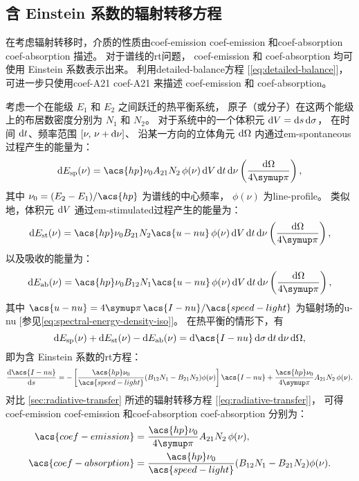 \subsection{含 Einstein 系数的辐射转移方程}

在考虑辐射转移时，介质的性质由\acl{coef-emission} \acs{coef-emission}
和\acl{coef-absorption} \acs{coef-absorption} 描述。
对于谱线的\ac{rt}问题，
\acs{coef-emission} 和 \acs{coef-absorption} 均可使用 Einstein 系数表示出来。
利用\ac{detailed-balance}方程 [\autoref{eq:detailed-balance}]，
可进一步只使用\acl{coef-A21} \ac{coef-A21}
来描述 \acs{coef-emission} 和 \acs{coef-absorption}。

考虑一个在能级 $E_1$ 和 $E_2$ 之间跃迁的热平衡系统，
原子（或分子）在这两个能级上的布居数密度分别为 $N_1$ 和 $N_2$。
对于系统中的一个体积元 $\mathrm{d}V = \mathrm{d}s\,\mathrm{d}\sigma$，
在时间 $\mathrm{d}t$、频率范围 $[\nu, \,\nu+\mathrm{d}\nu]$、
沿某一方向的立体角元 $\mathrm{d}\Omega$ 内通过\ac{em-spontaneous}过程产生的能量为：
\begin{equation}
  \D{E_{\R{sp}}(\nu)}
    = \acs{hp} \nu_0 A_{21} N_2 \,\phi(\nu)
      \,\D{V}\,\D{t}\,\D{\nu} \left( \frac{\D{\Omega}}{4\Cpi} \right) ,
\end{equation}
其中 $\nu_0 = (E_2 - E_1) / \acs{hp}$ 为谱线的中心频率，
$\phi(\nu)$ 为\acf{line-profile}。
类似地，体积元 $\mathrm{d}V$ 通过\ac{em-stimulated}过程产生的能量为：
\begin{equation}
  \D{E_{\R{st}}(\nu)}
    = \acs{hp} \nu_0 B_{21} N_2 \acs{u-nu} \,\phi(\nu)
      \,\D{V}\,\D{t}\,\D{\nu} \left( \frac{\D{\Omega}}{4\Cpi} \right) ,
\end{equation}
以及吸收的能量为：
\begin{equation}
  \D{E_{\R{ab}}(\nu)}
    = \acs{hp} \nu_0 B_{12} N_1 \acs{u-nu} \,\phi(\nu)
      \,\D{V}\,\D{t}\,\D{\nu} \left( \frac{\D{\Omega}}{4\Cpi} \right) ,
\end{equation}
其中
$\acs{u-nu} = 4\Cpi\,\acs{I-nu} / \acs{speed-light}$
为辐射场的\acl{u-nu} [参见\autoref{eq:spectral-energy-density-iso}]。
在热平衡的情形下，有
\begin{equation}
  \D{E_{\R{sp}}(\nu)} + \D{E_{\R{st}}(\nu)} - \D{E_{\R{ab}}(\nu)}
    = \D{\acs{I-nu}}\,\D{\sigma}\,\D{t}\,\D{\nu}\,\D{\Omega} ,
\end{equation}
即为含 Einstein 系数的\ac{rt}方程：
\begin{equation}
  \diff{\acs{I-nu}}{s}
    = - \left [ \frac{\acs{hp} \nu_0}{\acs{speed-light}}
      (B_{12} N_1 - B_{21} N_2) \phi(\nu) \right] \acs{I-nu}
      + \frac{\acs{hp} \nu_0}{4\Cpi} A_{21} N_2 \,\phi(\nu) .
\end{equation}
对比 \autoref{sec:radiative-transfer} 所述的辐射转移方程
[\autoref{eq:radiative-transfer}]，
可得\acl{coef-emission} \acs{coef-emission}
和\acl{coef-absorption} \acs{coef-absorption} 分别为：
\begin{align}
  \acs{coef-emission}
    & = \frac{\acs{hp} \nu_0}{4\Cpi} A_{21} N_2 \,\phi(\nu) ,
  \label{eq:coef-emission-einstein} \\
  \acs{coef-absorption}
    & = \frac{\acs{hp} \nu_0}{\acs{speed-light}}
      (B_{12} N_1 - B_{21} N_2) \phi(\nu) .
  \label{eq:coef-absorption-einstein1}
\end{align}

